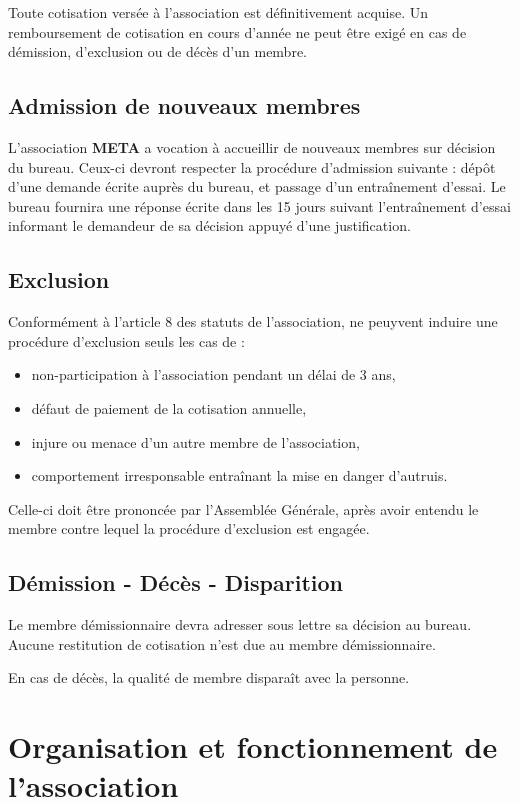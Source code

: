 \documentclass[a4paper,french,10pt]{article}
\newcommand{\meta}{\textbf{META}}
\begin{document}
Toute cotisation versée à l'association est définitivement acquise. Un remboursement de cotisation en cours d'année ne peut être exigé en cas de démission, d'exclusion ou de décès d'un membre.

\subsection{Admission de nouveaux membres}

L'association \meta{} a vocation à accueillir de nouveaux membres sur décision du bureau. Ceux-ci devront respecter la procédure d'admission suivante : dépôt d'une demande écrite auprès du bureau, et passage d'un entraînement d'essai. Le bureau fournira une réponse écrite dans les 15 jours suivant l'entraînement d'essai informant le demandeur de sa décision appuyé d'une justification.

\subsection{Exclusion}
Conformément à l'article 8 des statuts de l'association, ne peuyvent induire une procédure d'exclusion seuls les cas de :
\begin{itemize}
\item non-participation à l'association pendant un délai de 3 ans,
\item défaut de paiement de la cotisation annuelle,
\item injure ou menace d'un autre membre de l'association,
\item comportement irresponsable entraînant la mise en danger d'autruis.
\end{itemize}

Celle-ci doit être prononcée par l'Assemblée Générale, après avoir entendu le membre contre lequel la procédure d'exclusion est engagée.

\subsection{Démission - Décès - Disparition}
Le membre démissionnaire devra adresser sous lettre sa décision au bureau.
Aucune restitution de cotisation n'est due au membre démissionnaire.

En cas de décès, la qualité de membre disparaît avec la personne.

\section{Organisation et fonctionnement de l'association}
\end{document}
